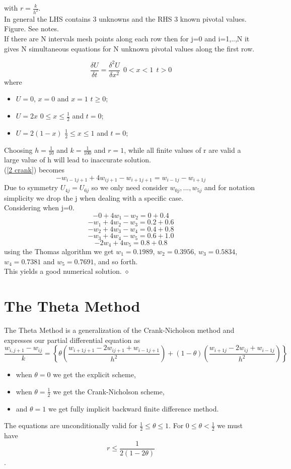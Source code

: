 with $r=\frac{k}{h^2}$.\\
In general the LHS contains 3 unknowns and the RHS 3 known pivotal values.
Figure. See notes.\\
If there are N intervals mesh points along each row then for j=0 and i=1,..,N it 
gives N simultaneous equations for N unknown pivotal values along the first row.\\
\begin{example}
\[\frac{\delta U}{\delta t}=\frac{\delta^2 U}{\delta x^2} \ \ 0<x<1 \ \ t>0 \]
where
\begin{itemize}
\item
$U=0$,  $x=0$  and $x=1$ $t\geq0$;
\item
$U=2x$  $0\leq x \leq \frac{1}{2}$ and $t=0$;
\item
$U=2(1-x)$  $ \frac{1}{2}\leq x \leq 1$ and $t=0$;
\end{itemize}
Choosing $h=\frac{1}{10}$ and $k=\frac{1}{100}$ and $r=1$, while all finite values
of r are valid a large value of h will lead to inaccurate solution.\\
(\ref{2 crank}) becomes
\[
-w_{i-1j+1}+4w_{ij+1}-w_{i+1j+1}
=
w_{i-1j}-w_{i+1j}
\]
Due to symmetry $U_{4j}=U_{6j}$ so we only need consider $w_{0j},...,w_{5j}$
and for notation simplicity we drop the j when dealing with a specific case.\\
Considering when j=0.
\[-0+4w_1-w_2 = 0+0.4 \]
\[-w_1+4w_2-w_3 = 0.2+0.6 \]
\[-w_2+4w_3-w_4 = 0.4+0.8 \]
\[-w_3+4w_4-w_5 = 0.6+1.0 \]
\[-2w_4+4w_5 = 0.8+0.8 \]
using the Thomas algorithm we get $w_1=0.1989$, $w_2=0.3956$, $w_3=0.5834$, $w_4=0.7381$
and $w_5 = 0.7691$, and so forth.\\
This yields a good numerical solution.
$\diamond$
\end{example}
\section{The Theta Method}
The Theta Method is a generalization of the Crank-Nicholson method and expresses
our partial differential equation as
\begin{equation}
\label{2 theta}
\frac{w_{i,j+1}-w_{ij}}{k}=\left\{\theta\left(\frac{w_{i+1j+1}-2w_{ij+1}+w_{i-1j+1}}{h^2}\right)+
(1-\theta)\left(
\frac{w_{i+1j}-2w_{ij}+w_{i-1j}}{h^2}
\right)
\right\}
\end{equation}
\begin{itemize}
\item
when $\theta=0$ we get the explicit scheme,
\item
when $\theta=\frac{1}{2}$ we get the Crank-Nicholson scheme,
\item
and $\theta=1$ we get fully implicit backward finite difference method.
\end{itemize}
The equations are unconditionally valid for $\frac{1}{2}\leq \theta \leq 1$.
For  $0\leq \theta < \frac{1}{2}$ we must have
\[r\leq \frac{1}{2(1-2\theta)} \].

